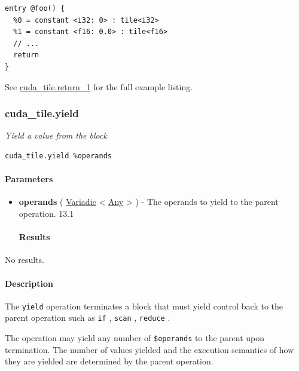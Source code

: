 \documentclass{article}
\begin{document}
\begin{lstlisting}
entry @foo() {
  %0 = constant <i32: 0> : tile<i32>
  %1 = constant <f16: 0.0> : tile<f16>
  // ...
  return
}
\end{lstlisting}

See \href{https://docs.nvidia.com/cuda/tile-ir/latest/sections/appendix.html#example-cuda-tile-return-1}{cuda\_tile.return\_1} for the full example listing.



\subsubsection{cuda\_tile.yield}

\textit{Yield a value from the block}


\begin{lstlisting}
cuda_tile.yield %operands
\end{lstlisting}

\paragraph{Parameters}

\begin{itemize}
\item \textbf{operands} ( \href{https://docs.nvidia.com/cuda/tile-ir/latest/sections/operations.html#type-variadic}{Variadic} < \href{https://docs.nvidia.com/cuda/tile-ir/latest/sections/operations.html#type-any}{Any} > ) - The operands to yield to the parent operation. 13.1


\paragraph{Results}

\end{itemize}
No results.



\paragraph{Description}

The \texttt{yield} operation terminates a block that must yield control back to the parent operation such as \texttt{if} , \texttt{scan} , \texttt{reduce} .


The operation may yield any number of \texttt{\$operands} to the parent upon termination. The number of values yielded and the execution semantics of how they are yielded are determined by the parent operation.
\end{document}
